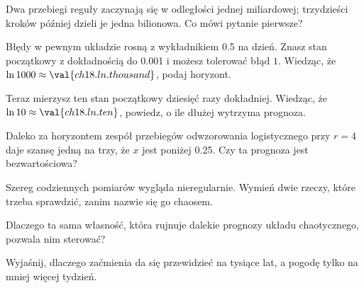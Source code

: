 \begin{checkpoint}
\item Dwa przebiegi reguły zaczynają się w odległości jednej miliardowej;
  trzydzieści kroków później dzieli je jedna bilionowa. Co mówi pytanie
  pierwsze?
\item Błędy w pewnym układzie rosną z wykładnikiem \num{0.5} na dzień. Znasz
  stan początkowy z dokładnością do \num{0.001} i możesz tolerować błąd $1$.
  Wiedząc, że $\ln 1000 \approx \val{ch18.ln.thousand}$, podaj horyzont.
\item Teraz mierzysz ten stan początkowy dziesięć razy dokładniej. Wiedząc,
  że $\ln 10 \approx \val{ch18.ln.ten}$, powiedz, o ile dłużej wytrzyma
  prognoza.
\item Daleko za horyzontem zespół przebiegów odwzorowania logistycznego przy
  $r = 4$ daje szansę jedną na trzy, że $x$ jest poniżej \num{0.25}. Czy
  ta prognoza jest bezwartościowa?
\item Szereg codziennych pomiarów wygląda nieregularnie. Wymień dwie rzeczy,
  które trzeba sprawdzić, zanim nazwie się go chaosem.
\item Dlaczego ta sama własność, która rujnuje dalekie prognozy układu
  chaotycznego, pozwala nim sterować?
\item Wyjaśnij, dlaczego zaćmienia da się przewidzieć na tysiące lat, a
  pogodę tylko na mniej więcej tydzień.
\end{checkpoint}
